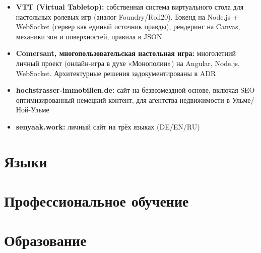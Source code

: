 \begin{itemize}
  \item \textbf{VTT (Virtual Tabletop):} собственная система виртуального стола для настольных ролевых игр (аналог Foundry/Roll20). Бэкенд на Node.js + WebSocket (сервер как единый источник правды), рендеринг на Canvas, механики зон и поверхностей, правила в JSON
  \item \textbf{Comersant, многопользовательская настольная игра:} многолетний личный проект (онлайн-игра в духе «Монополии») на Angular, Node.js, WebSocket. Архитектурные решения задокументированы в ADR
  \item \textbf{hochstrasser-immobilien.de:} сайт на безвозмездной основе, включая SEO-оптимизированный немецкий контент, для агентства недвижимости в Ульме/Ной-Ульме
  \item \textbf{senyaak.work:} личный сайт на трёх языках (DE/EN/RU)
\end{itemize}

\section*{Языки}


\section*{Профессиональное обучение}


\section*{Образование}

